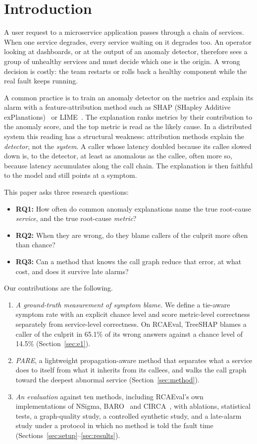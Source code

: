 \documentclass[conference]{IEEEtran}
\begin{document}
\section{Introduction}
A user request to a microservice application passes through a chain of services.
When one service degrades, every service waiting on it degrades too. An operator
looking at dashboards, or at the output of an anomaly detector, therefore sees a
group of unhealthy services and must decide which one is the origin. A wrong
decision is costly: the team restarts or rolls back a healthy component while the
real fault keeps running.

A common practice is to train an anomaly detector on the metrics and explain its
alarm with a feature-attribution method such as SHAP (SHapley Additive
exPlanations)~\cite{lundberg2017shap} or LIME~\cite{ribeiro2016lime}. The
explanation ranks metrics by their contribution to the anomaly score, and the top
metric is read as the likely cause. In a distributed system this reading has a
structural weakness: attribution methods explain the \emph{detector}, not the
\emph{system}. A caller whose latency doubled because its callee slowed down is, to
the detector, at least as anomalous as the callee, often more so, because latency
accumulates along the call chain. The explanation is then faithful to the model and
still points at a symptom.

This paper asks three research questions:
\begin{itemize}
\item \textbf{RQ1:} How often do common anomaly explanations name the true
root-cause \emph{service}, and the true root-cause \emph{metric}?
\item \textbf{RQ2:} When they are wrong, do they blame callers of the culprit more
often than chance?
\item \textbf{RQ3:} Can a method that knows the call graph reduce that error, at
what cost, and does it survive late alarms?
\end{itemize}

Our contributions are the following.
\begin{enumerate}
\item \emph{A ground-truth measurement of symptom blame.} We define a tie-aware
symptom rate with an explicit chance level and score metric-level correctness
separately from service-level correctness. On RCAEval, TreeSHAP blames a caller of
the culprit in 65.1\% of its wrong answers against a chance level of 14.5\%
(Section~\ref{sec:e1}).
\item \emph{PARE}, a lightweight propagation-aware method that separates what a
service does to itself from what it inherits from its callees, and walks the call
graph toward the deepest abnormal service (Section~\ref{sec:method}).
\item \emph{An evaluation} against ten methods, including RCAEval's own
implementations of NSigma, BARO~\cite{pham2024baro} and CIRCA~\cite{li2022circa},
with ablations, statistical tests, a graph-quality study, a controlled synthetic
study, and a late-alarm study under a protocol in which no method is told the
fault time (Sections~\ref{sec:setup}--\ref{sec:results}).
\end{enumerate}
\end{document}
